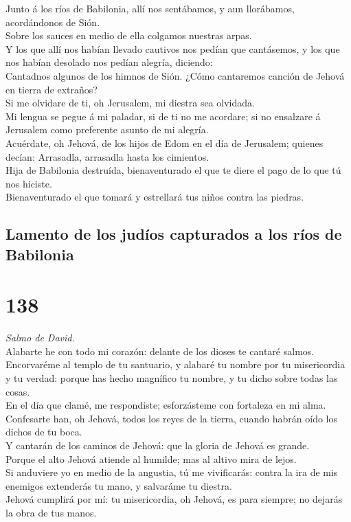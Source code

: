  Junto á los ríos de Babilonia, allí nos sentábamos, y aun
llorábamos, acordándonos de Sión.\\
 Sobre los sauces en medio de ella colgamos nuestras
arpas.\\
 Y los que allí nos habían llevado cautivos nos pedían que
cantásemos, y los que nos habían desolado nos pedían alegría,
diciendo:\\
 Cantadnos algunos de los himnos de Sión. ¿Cómo cantaremos
canción de Jehová en tierra de extraños?\\
 Si me olvidare de ti, oh Jerusalem, mi diestra sea
olvidada.\\
 Mi lengua se pegue á mi paladar, si de ti no me acordare;
si no ensalzare á Jerusalem como preferente asunto de mi alegría.\\
 Acuérdate, oh Jehová, de los hijos de Edom en el día de
Jerusalem; quienes decían: Arrasadla, arrasadla hasta los cimientos.\\
 Hija de Babilonia destruída, bienaventurado el que te diere
el pago de lo que tú nos hiciste.\\
 Bienaventurado el que tomará y estrellará tus niños contra
las piedras.

\hypertarget{lamento-de-los-juduxedos-capturados-a-los-ruxedos-de-babilonia-1}{%
\subsection{Lamento de los judíos capturados a los ríos de
Babilonia}\label{lamento-de-los-juduxedos-capturados-a-los-ruxedos-de-babilonia-1}}

\hypertarget{section-137}{%
\section{138}\label{section-137}}

 \emph{Salmo de David.}\\
Alabarte he con todo mi corazón: delante de los dioses te cantaré
salmos.\\
 Encorvaréme al templo de tu santuario, y alabaré tu nombre
por tu misericordia y tu verdad: porque has hecho magnífico tu nombre, y
tu dicho sobre todas las cosas.\\
 En el día que clamé, me respondiste; esforzásteme con
fortaleza en mi alma.\\
 Confesarte han, oh Jehová, todos los reyes de la tierra,
cuando habrán oído los dichos de tu boca.\\
 Y cantarán de los caminos de Jehová: que la gloria de
Jehová es grande.\\
 Porque el alto Jehová atiende al humilde; mas al altivo
mira de lejos.\\
 Si anduviere yo en medio de la angustia, tú me vivificarás:
contra la ira de mis enemigos extenderás tu mano, y salvaráme tu
diestra.\\
 Jehová cumplirá por mí: tu misericordia, oh Jehová, es para
siempre; no dejarás la obra de tus manos.

